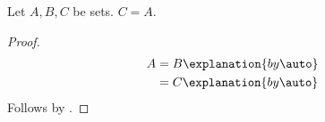 \begin{proposition}\label{calculation_link_order}
    Let $A,B,C$ be sets.
    $C=A$.
\end{proposition}
\begin{proof}
    \begin{align*}
        A
            &= B
                \explanation{by \auto}
                \\
            &= C
                \explanation{by \auto}
    \end{align*}
    Follows by \auto.
\end{proof}
